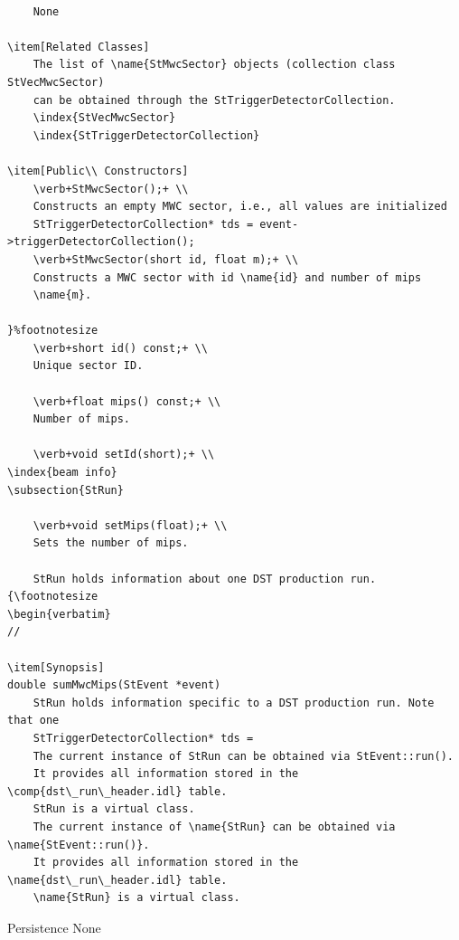 \begin{Entry}
{\begin{verbatim}
   
    None

\item[Related Classes]
    The list of \name{StMwcSector} objects (collection class StVecMwcSector)
    can be obtained through the StTriggerDetectorCollection.
    \index{StVecMwcSector}
    \index{StTriggerDetectorCollection}
    
\item[Public\\ Constructors]
    \verb+StMwcSector();+ \\
    Constructs an empty MWC sector, i.e., all values are initialized
    StTriggerDetectorCollection* tds = event->triggerDetectorCollection();
    \verb+StMwcSector(short id, float m);+ \\
    Constructs a MWC sector with id \name{id} and number of mips
    \name{m}.

}%footnotesize    
    \verb+short id() const;+ \\
    Unique sector ID.

    \verb+float mips() const;+ \\
    Number of mips.

    \verb+void setId(short);+ \\
\index{beam info}
\subsection{StRun} 

    \verb+void setMips(float);+ \\
    Sets the number of mips.

    StRun holds information about one DST production run.
{\footnotesize
\begin{verbatim}
//
    
\item[Synopsis] 
double sumMwcMips(StEvent *event)
    StRun holds information specific to a DST production run. Note that one
    StTriggerDetectorCollection* tds =
    The current instance of StRun can be obtained via StEvent::run().
    It provides all information stored in the \comp{dst\_run\_header.idl} table.
    StRun is a virtual class.
    The current instance of \name{StRun} can be obtained via \name{StEvent::run()}.
    It provides all information stored in the \name{dst\_run\_header.idl} table.
    \name{StRun} is a virtual class.
\end{verbatim}
}%
\item[Persistence]
    None

%
%

\end{Entry}
